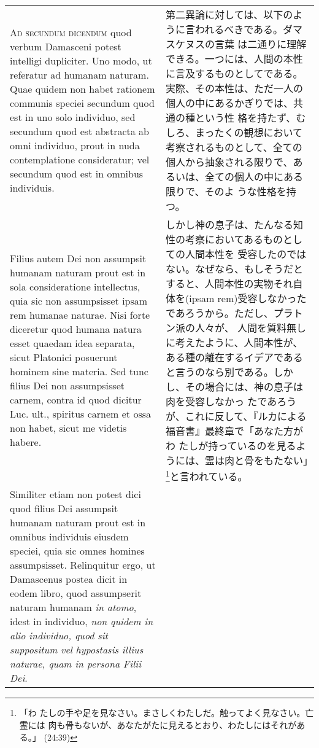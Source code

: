 \documentclass[10pt]{jsarticle} %
\begin{document}
\begin{longtable}{p{21em}p{21em}}
\\



{\scshape Ad secundum dicendum} quod verbum Damasceni potest intelligi
dupliciter. Uno modo, ut referatur ad humanam naturam. Quae quidem non
habet rationem communis speciei secundum quod est in uno solo
individuo, sed secundum quod est abstracta ab omni individuo, prout in
nuda contemplatione consideratur; vel secundum quod est in omnibus
individuis.


&

第二異論に対しては、以下のように言われるべきである。ダマスケヌスの言葉
は二通りに理解できる。一つには、人間の本性に言及するものとしてである。
実際、その本性は、ただ一人の個人の中にあるかぎりでは、共通の種という性
格を持たず、むしろ、まったくの観想において考察されるものとして、全ての
個人から抽象される限りで、あるいは、全ての個人の中にある限りで、そのよ
うな性格を持つ。


\\


Filius autem Dei non assumpsit humanam naturam prout est in sola
consideratione intellectus, quia sic non assumpsisset ipsam rem
humanae naturae. Nisi forte diceretur quod humana natura esset quaedam
idea separata, sicut Platonici posuerunt hominem sine materia. Sed
tunc filius Dei non assumpsisset carnem, contra id quod dicitur
Luc. ult., spiritus carnem et ossa non habet, sicut me videtis habere.



&


しかし神の息子は、たんなる知性の考察においてあるものとしての人間本性を
受容したのではない。なぜなら、もしそうだとすると、人間本性の実物それ自
体を(ipsam rem)受容しなかったであろうから。ただし、プラトン派の人々が、
人間を質料無しに考えたように、人間本性が、ある種の離在するイデアである
と言うのなら別である。しかし、その場合には、神の息子は肉を受容しなかっ
たであろうが、これに反して、『ルカによる福音書』最終章で「あなた方がわ
たしが持っているのを見るようには、霊は肉と骨をもたない」\footnote{「わ
たしの手や足を見なさい。まさしくわたしだ。触ってよく見なさい。亡霊には
肉も骨もないが、あなたがたに見えるとおり、わたしにはそれがある。」
(24:39)}と言われている。

\\


Similiter etiam non potest dici quod filius Dei assumpsit humanam
naturam prout est in omnibus individuis eiusdem speciei, quia sic
omnes homines assumpsisset. Relinquitur ergo, ut Damascenus postea
dicit in eodem libro, quod assumpserit naturam humanam {\itshape in
atomo}, idest in individuo, {\itshape non quidem in alio individuo,
quod sit suppositum vel hypostasis illius naturae, quam in persona
Filii Dei}.




\end{longtable}
\end{document}
